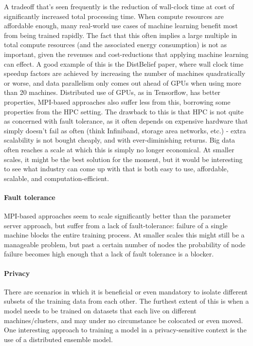A tradeoff that’s seen frequently is the reduction of wall-clock time at cost of significantly increased total processing time. When compute resources are affordable enough, many real-world use cases of machine learning benefit most from being trained rapidly. The fact that this often implies a large multiple in total compute resources (and the associated energy consumption) is not as important, given the revenues and cost-reductions that applying machine learning can effect.  A good example of this is the DistBelief paper, where wall clock time speedup factors are achieved by increasing the number of machines quadratically or worse, and data parallelism only comes out ahead of GPUs when using more than 20 machines. Distributed use of GPUs, as in Tensorflow, has better properties, 
MPI-based approaches also suffer less from this, borrowing some properties from the HPC setting. The drawback to this is that HPC is not quite as concerned with fault tolerance, as it often depends on expensive hardware that simply doesn’t fail as often (think Infiniband, storage area networks, etc.) - extra scalability is not bought cheaply, and with ever-diminishing returns. Big data often reaches a scale at which this is simply no longer economical. At smaller scales, it might be the best solution for the moment, but it would be interesting to see what industry can come up with that is both easy to use, affordable, scalable, and computation-efficient.

\paragraph{Fault tolerance}

MPI-based approaches seem to scale significantly better than the parameter server approach, but suffer from a lack of fault-tolerance: failure of a single machine blocks the entire training process. At smaller scales this might still be a manageable problem, but past a certain number of nodes the probability of node failure becomes high enough that a lack of fault tolerance is a blocker.

\paragraph{Privacy}

There are scenarios in which it is beneficial or even mandatory to isolate different subsets of the training data from each other. The furthest extent of this is when a model needs to be trained on datasets that each live on different machines/clusters, and may under no circumstance be colocated or even moved.
One interesting approach to training a model in a privacy-sensitive context is the use of a distributed ensemble model.
